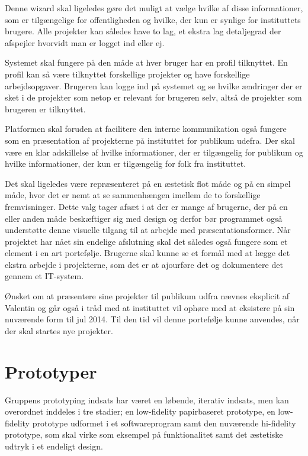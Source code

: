 Denne wizard skal ligeledes gøre det muligt at vælge hvilke af disse informationer, som er tilgængelige for offentligheden og hvilke, der kun er synlige for instituttets brugere. Alle projekter kan således have to lag, et ekstra lag detaljegrad der afspejler hvorvidt man er logget ind eller ej.

Systemet skal fungere på den måde at hver bruger har en profil tilknyttet. En profil kan så være tilknyttet forskellige projekter og have forskellige arbejdsopgaver. Brugeren kan logge ind på systemet og se hvilke ændringer der er sket i de projekter som netop er relevant for brugeren selv, altså de projekter som brugeren er tilknyttet.

Platformen skal foruden at facilitere den interne kommunikation også fungere som en præsentation af projekterne på instituttet for publikum udefra. Der skal være en klar adskillelse af hvilke informationer, der er tilgængelig for publikum og hvilke informationer, der kun er tilgængelig for folk fra instituttet. 

Det skal ligeledes være repræsenteret på en æstetisk flot måde og på en simpel måde, hvor det er nemt at se sammenhængen imellem de to forskellige fremvisninger. Dette valg tager afsæt i at der er mange af brugerne, der på en eller anden måde beskæftiger sig med design og derfor bør programmet også understøtte denne visuelle tilgang til at arbejde med præsentationsformer.
Når projektet har nået sin endelige afslutning skal det således også fungere som et element i en art portefølje. Brugerne skal kunne se et formål med at lægge det ekstra arbejde i projekterne, som det er at ajourføre det og dokumentere det gennem et IT-system.

Ønsket om at præsentere sine projekter til publikum udfra nævnes eksplicit af Valentin og går også i tråd med at instituttet vil ophøre med at eksistere på sin nuværende form til jul 2014. Til den tid vil denne portefølje kunne anvendes, når der skal startes nye projekter. 

\section{Prototyper}
Gruppens prototyping indsats har været en løbende, iterativ indsats, men kan overordnet inddeles i tre stadier; en low-fidelity papirbaseret prototype, en low-fidelity prototype udformet i et softwareprogram samt den nuværende hi-fidelity prototype, som skal virke som eksempel på funktionalitet samt det æstetiske udtryk i et endeligt design.

